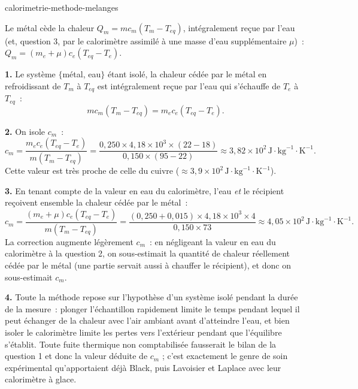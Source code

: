 \begin{exo}{calorimetrie-methode-melanges}
\begin{indication}
Le métal cède la chaleur $Q_m = mc_m(T_m - T_{eq})$, intégralement reçue par l'eau (et, question 3, par le calorimètre assimilé à une masse d'eau supplémentaire $\mu$)~: $Q_m = (m_e+\mu)c_e(T_{eq}-T_e)$.
\end{indication}

\begin{solution}
\textbf{1.} Le système $\{$métal, eau$\}$ étant isolé, la chaleur cédée par le métal en refroidissant de $T_m$ à $T_{eq}$ est intégralement reçue par l'eau qui s'échauffe de $T_e$ à $T_{eq}$~:
\[
mc_m(T_m - T_{eq}) = m_e c_e (T_{eq} - T_e).
\]

\textbf{2.} On isole $c_m$~:
\[
c_m = \frac{m_e c_e (T_{eq}-T_e)}{m(T_m-T_{eq})}
= \frac{0{,}250\times4{,}18\times10^3\times(22-18)}{0{,}150\times(95-22)}
\approx3{,}82\times10^2\,\text{J}\!\cdot\!\text{kg}^{-1}\!\cdot\!\text{K}^{-1}.
\]
Cette valeur est très proche de celle du cuivre ($\approx3{,}9\times10^2\,\text{J}\!\cdot\!\text{kg}^{-1}\!\cdot\!\text{K}^{-1}$).

\textbf{3.} En tenant compte de la valeur en eau du calorimètre, l'eau \emph{et} le récipient reçoivent ensemble la chaleur cédée par le métal~:
\[
c_m = \frac{(m_e+\mu) c_e (T_{eq}-T_e)}{m(T_m-T_{eq})}
= \frac{(0{,}250+0{,}015)\times4{,}18\times10^3\times4}{0{,}150\times73}
\approx4{,}05\times10^2\,\text{J}\!\cdot\!\text{kg}^{-1}\!\cdot\!\text{K}^{-1}.
\]
La correction augmente légèrement $c_m$~: en négligeant la valeur en eau du calorimètre à la question 2, on sous-estimait la quantité de chaleur réellement cédée par le métal (une partie servait aussi à chauffer le récipient), et donc on sous-estimait $c_m$.

\textbf{4.} Toute la méthode repose sur l'hypothèse d'un système isolé pendant la durée de la mesure~: plonger l'échantillon rapidement limite le temps pendant lequel il peut échanger de la chaleur avec l'air ambiant avant d'atteindre l'eau, et bien isoler le calorimètre limite les pertes vers l'extérieur pendant que l'équilibre s'établit. Toute fuite thermique non comptabilisée fausserait le bilan de la question 1 et donc la valeur déduite de $c_m$ ; c'est exactement le genre de soin expérimental qu'apportaient déjà Black, puis Lavoisier et Laplace avec leur calorimètre à glace.
\end{solution}

\end{exo}

